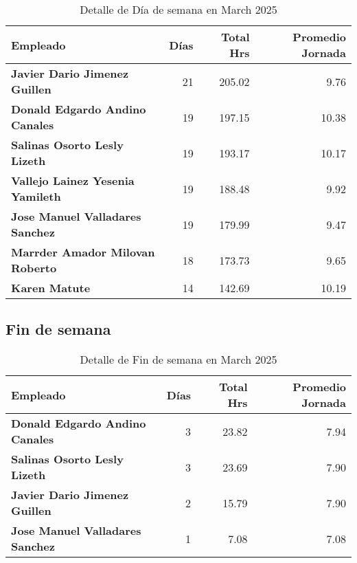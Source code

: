 \documentclass[11pt,a4paper]{article}
\newcommand{\mejoradatabla}[1]{
  \renewcommand{\arraystretch}{1.3}
  \setlength{\tabcolsep}{10pt}
  #1
  \renewcommand{\arraystretch}{1}
  \setlength{\tabcolsep}{6pt}
}
\begin{document}
\vspace{0.5cm}
\begin{table}[H]
\centering
\mejoradatabla{
\begin{tabular}{>{\bfseries}lrrr}
\toprule
\rowcolor{grisclaro} \textbf{Empleado} & \textbf{Días} & \textbf{Total Hrs} & \textbf{Promedio Jornada}\\
\midrule

Javier Dario  Jimenez Guillen & 21 & 205.02 & 9.76\\

Donald Edgardo Andino Canales & 19 & 197.15 & 10.38\\

Salinas Osorto Lesly Lizeth & 19 & 193.17 & 10.17\\

Vallejo Lainez Yesenia Yamileth & 19 & 188.48 & 9.92\\

Jose Manuel Valladares Sanchez & 19 & 179.99 & 9.47\\

Marrder Amador Milovan Roberto & 18 & 173.73 & 9.65\\

Karen Matute & 14 & 142.69 & 10.19\\

\bottomrule
\end{tabular}
}
\caption{Detalle de Día de semana en March 2025}
\end{table}



\subsection{ Fin de semana }

\vspace{0.5cm}
\begin{table}[H]
\centering
\mejoradatabla{
\begin{tabular}{>{\bfseries}lrrr}
\toprule
\rowcolor{grisclaro} \textbf{Empleado} & \textbf{Días} & \textbf{Total Hrs} & \textbf{Promedio Jornada}\\
\midrule

Donald Edgardo Andino Canales & 3 & 23.82 & 7.94\\

Salinas Osorto Lesly Lizeth & 3 & 23.69 & 7.90\\

Javier Dario  Jimenez Guillen & 2 & 15.79 & 7.90\\

Jose Manuel Valladares Sanchez & 1 & 7.08 & 7.08\\

\bottomrule
\end{tabular}
}
\caption{Detalle de Fin de semana en March 2025}
\end{table}
\end{document}
